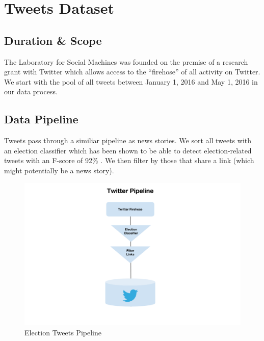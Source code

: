 \documentclass[letterpaper]{article}
\begin{document}
\section{Tweets Dataset}

\subsection{Duration \& Scope} 
The Laboratory for Social Machines was founded on the premise of a research grant with Twitter which allows access to the ``firehose'' of all activity on Twitter. We start with the pool of all tweets between January 1, 2016 and May 1, 2016 in our data process.

\subsection{Data Pipeline}

Tweets pass through a similiar pipeline as news stories. We sort all tweets with an election classifier which has been shown to be able to detect election-related tweets with an F-score of 92\% \cite{vijayaraghavan2016automatic}. We then filter by those that share a link (which might potentially be a news story).

\begin{figure}[t!]
\centering
\includegraphics[width=\columnwidth]{Twitter-pipeline}  
\caption{Election Tweets Pipeline
     \label{fig:data-stack-Twitter}}
\end{figure}


\end{document}

